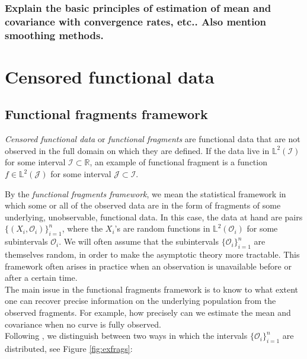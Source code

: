 \documentclass[10pt, a4paper]{report}
\newcommand{\Ll}[0]{\mathbb{L}}
\newcommand{\R}[0]{\mathbb{R}}
\theoremstyle{definition}
\theoremstyle{remark}
\begin{document}
\subsection{Explain the basic principles of estimation of mean and covariance with convergence rates, etc.. Also mention smoothing methods. }

\chapter{Censored functional data}\label{chap:frags}
\section{Functional fragments framework}\label{introfrag}
\textit{Censored functional data} or \textit{functional fragments} are functional data that are not observed in the full domain on which they are defined. If the data live in $\Ll^2(\mathcal{I})$ for some interval $\mathcal{I} \subset \R$, an example of functional fragment is a function $f \in \Ll^2(\mathcal{J})$ for some interval $\mathcal{J}\subset \mathcal{I}$.

By the \textit{functional fragments framework}, we mean the statistical framework in which some or all of the observed data are in the form of fragments of some underlying, unobservable, functional data. In this case, the data at hand are pairs $\{(X_i,\mathcal{O}_i)\}_{i=1}^n$, where the $X_i$'s are random functions in $\Ll^2(\mathcal{O}_i)$ for some subintervals $\mathcal{O}_i$. We will often assume that the subintervals $\{\mathcal{O}_i\}_{i=1}^n$ are themselves random, in order to make the asymptotic theory more tractable. This framework often arises in practice when an observation is unavailable before or after a certain time.\\
The main issue in the functional fragments framework is to know to what extent one can recover precise information on the underlying population from the observed fragments. For example, how precisely can we estimate the mean and covariance when no curve is fully observed.\\
Following \cite{DP2}, we distinguish between two ways in which the intervals $\{\mathcal{O}_i\}_{i=1}^n$ are distributed, see Figure \ref{fig:exfrags}:\\
\end{document}
